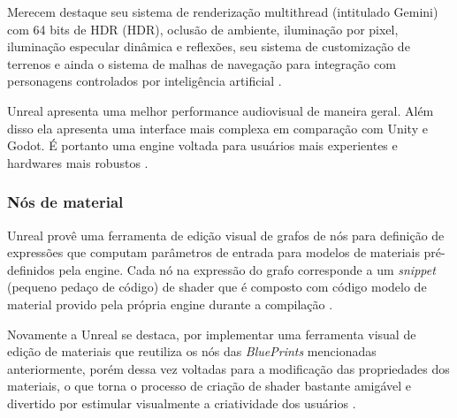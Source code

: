 \begin{figure}[h!]
	\centering
\end{figure}
\nocite{blueprint}

Merecem destaque seu sistema de renderização \Gls{multithread} (intitulado Gemini) com 64 bits de HDR (\acrlong{HDR}), oclusão de ambiente, iluminação por pixel, iluminação especular dinâmica e reflexões, seu sistema de customização de terrenos e ainda o sistema de malhas de navegação para integração com personagens controlados por inteligência artificial \cite{armstrong2013game}.

Unreal apresenta uma melhor performance audiovisual de maneira geral. Além disso ela apresenta uma interface mais complexa em comparação com Unity e Godot. É portanto uma engine voltada para usuários mais experientes e hardwares mais robustos \cite{stelios2017}.
 
\subsubsection{Nós de material}
\label{sec:material-nodes}

Unreal provê uma ferramenta de edição visual de grafos de nós para definição de expressões que computam parâmetros de entrada para modelos de materiais pré-definidos pela engine. Cada nó na expressão do grafo corresponde a um \textit{snippet} (pequeno pedaço de código) de shader que é composto com código modelo de material provido pela própria engine durante a compilação \cite{he2016rapid}.

Novamente a Unreal se destaca, por implementar uma ferramenta visual de edição de materiais que reutiliza os nós das \textit{BluePrints} mencionadas anteriormente, porém dessa vez voltadas para a modificação das propriedades dos materiais, o que torna o processo de criação de shader bastante amigável e divertido por estimular visualmente a criatividade dos usuários \cite{compStudyGE}. 

